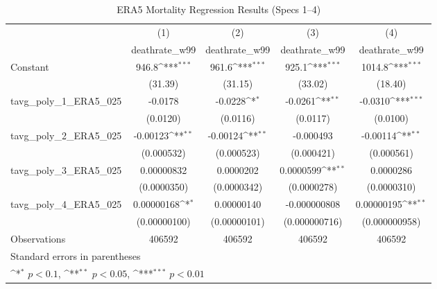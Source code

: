 \begin{table}[htbp]\centering
\def\sym#1{\ifmmode^{#1}\else\(^{#1}\)\fi}
\caption{ERA5 Mortality Regression Results (Specs 1–4)}
\begin{tabular}{l*{4}{c}}
\hline\hline
                    &\multicolumn{1}{c}{(1)}&\multicolumn{1}{c}{(2)}&\multicolumn{1}{c}{(3)}&\multicolumn{1}{c}{(4)}\\
                    &\multicolumn{1}{c}{deathrate\_w99}&\multicolumn{1}{c}{deathrate\_w99}&\multicolumn{1}{c}{deathrate\_w99}&\multicolumn{1}{c}{deathrate\_w99}\\
\hline
Constant            &       946.8\sym{***}&       961.6\sym{***}&       925.1\sym{***}&      1014.8\sym{***}\\
                    &     (31.39)         &     (31.15)         &     (33.02)         &     (18.40)         \\
[1em]
tavg\_poly\_1\_ERA5\_025&     -0.0178         &     -0.0228\sym{*}  &     -0.0261\sym{**} &     -0.0310\sym{***}\\
                    &    (0.0120)         &    (0.0116)         &    (0.0117)         &    (0.0100)         \\
[1em]
tavg\_poly\_2\_ERA5\_025&    -0.00123\sym{**} &    -0.00124\sym{**} &   -0.000493         &    -0.00114\sym{**} \\
                    &  (0.000532)         &  (0.000523)         &  (0.000421)         &  (0.000561)         \\
[1em]
tavg\_poly\_3\_ERA5\_025&  0.00000832         &   0.0000202         &   0.0000599\sym{**} &   0.0000286         \\
                    & (0.0000350)         & (0.0000342)         & (0.0000278)         & (0.0000310)         \\
[1em]
tavg\_poly\_4\_ERA5\_025&  0.00000168\sym{*}  &  0.00000140         &-0.000000808         &  0.00000195\sym{**} \\
                    &(0.00000100)         &(0.00000101)         &(0.000000716)         &(0.000000958)         \\
\hline
Observations        &      406592         &      406592         &      406592         &      406592         \\
\hline\hline
\multicolumn{5}{l}{\footnotesize Standard errors in parentheses}\\
\multicolumn{5}{l}{\footnotesize \sym{*} \(p<0.1\), \sym{**} \(p<0.05\), \sym{***} \(p<0.01\)}\\
\end{tabular}
\end{table}
